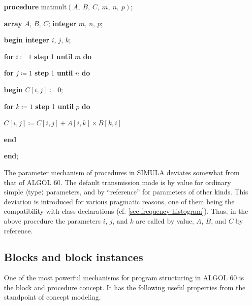 \documentclass[twoside,11pt]{book}
\begin{document}
\quad \textbf{procedure} matmult$(A,\ B,\ C,\ m,\ n,\ p)$;

\quad \quad \textbf{array} $A$, $B$, $C$; \textbf{integer} $m$, $n$, $p$;

\quad \textbf{begin integer} $i$, $j$, $k$;

\quad \quad \textbf{for} $i\coloneq 1$ \textbf{step} 1 \textbf{until} $m$ \textbf{do}

\quad \quad \textbf{for} $j\coloneq 1$ \textbf{step} 1 \textbf{until} $n$ \textbf{do}

\quad \quad \textbf{begin} $C[i, j]\coloneq 0$;

\quad \quad \quad \textbf{for} $k\coloneq 1$ \textbf{step} 1 \textbf{until} $p$ \textbf{do}

\quad \quad \quad \quad $C[i, j]\coloneq C[i, j] + A[i, k] \times B[k, i]$

\quad \quad \textbf{end}

\quad \textbf{end};

The parameter mechanism of procedures in SIMULA deviates somewhat from that of ALGOL 60. The default transmission mode is by value for ordinary simple $\langle$type$\rangle$ parameters, and by ``reference'' for parameters of other kinds. This deviation is introduced for various pragmatic reasons, one of them being the compatibility with class declarations (cf. \ref{sec:frequency-histogram}). Thus, in the above procedure the parameters $i$, $j$, and $k$ are called by value, $A$, $B$, and $C$ by reference.

\subsection{Blocks and block instances}

One of the most powerful mechanisms for program structuring in ALGOL 60 is the block and procedure concept. It has the following useful properties from the standpoint of concept modeling.
\end{document}
